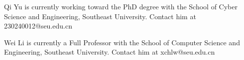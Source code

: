 \documentclass[lettersize,journal]{IEEEtran}
\begin{document}
%
\begin{IEEEbiographynophoto}{Qi Yu}
is currently working toward the PhD degree with the School of Cyber Science and Engineering, Southeast University. Contact him at 230240012@seu.edu.cn
\end{IEEEbiographynophoto}
\vspace{11pt}
\begin{IEEEbiographynophoto}{Wei Li}
is currently a Full Professor with the School of Computer Science and Engineering, Southeast University. Contact him at xchlw@seu.edu.cn
\end{IEEEbiographynophoto}

\vfill
\end{document}
